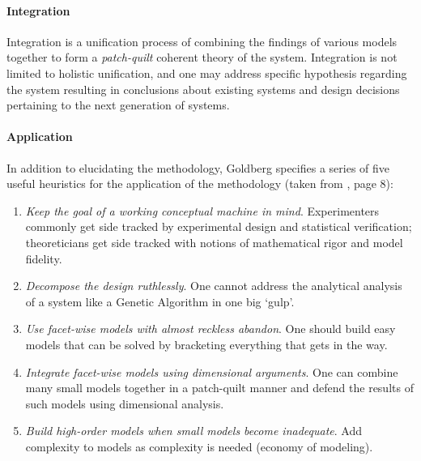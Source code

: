 \paragraph{Integration} 
Integration is a unification process of combining the findings of various models together to form a \emph{patch-quilt} coherent theory of the system. Integration is not limited to holistic unification, and one may address specific hypothesis regarding the system resulting in conclusions about existing systems and design decisions pertaining to the next generation of systems.

\paragraph{Application} 
In addition to elucidating the methodology, Goldberg specifies a series of five useful heuristics for the application of the methodology (taken from \cite{Goldberg1999a}, page 8):

\begin{enumerate}
	\item \emph{Keep the goal of a working conceptual machine in mind}. Experimenters commonly get side tracked by experimental design and statistical verification; theoreticians get side tracked with notions of mathematical rigor and model fidelity.
	\item \emph{Decompose the design ruthlessly}. One cannot address the analytical analysis of a system like a Genetic Algorithm in one big `gulp'.
	\item \emph{Use facet-wise models with almost reckless abandon}. One should build easy models that can be solved by bracketing everything that gets in the way.
	\item \emph{Integrate facet-wise models using dimensional arguments}. One can combine many small models together in a patch-quilt manner and defend the results of such models using dimensional analysis.
	\item \emph{Build high-order models when small models become inadequate}. Add complexity to models as complexity is needed (economy of modeling).
\end{enumerate}
